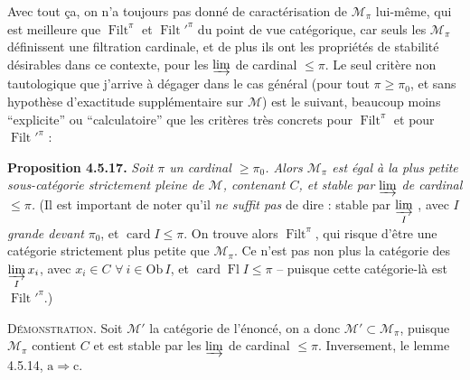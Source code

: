 \documentclass[11pt]{article}
\newcommand{\msp}[1]{\marginpar{\footnotesize [#1]}}
\newcommand{\Ob}{\mathrm{Ob}\,}
\newcommand{\card}{\operatorname{card}}
\newcommand{\Fl}{\operatorname{Fl}}
\newcommand{\Filt}{\operatorname{Filt}}
\begin{document}
Avec tout ça, on n'a toujours pas donné de caractérisation de $\mathcal{M}_{\pi}$ lui-même, qui est meilleure que $\Filt^{\pi}$ et $\Filt'^{\pi}$ du point de vue catégorique, car seuls les $\mathcal{M}_{\pi}$ définissent une filtration cardinale, et de plus ils ont les propriétés de stabilité désirables dans ce
\msp{page 138}
contexte, pour les $\varinjlim$ de cardinal $\leqslant \pi$. Le seul critère non tautologique que j'arrive à dégager dans le cas général (pour tout $\pi \geqslant \pi_0$, et sans hypothèse d'exactitude supplémentaire sur $\mathcal{M}$) est le suivant, beaucoup moins ``explicite'' ou ``calculatoire'' que les critères très concrets pour $\Filt^{\pi}$ et pour $\Filt'^{\pi}$ :

\textbf{Proposition 4.5.17.} \textit{Soit $\pi$ un cardinal $\geqslant \pi_0$. Alors $\mathcal{M}_{\pi}$ est égal à la plus petite sous-catégorie strictement pleine de $\mathcal{M}$, contenant $C$, et stable par} $\varinjlim$ \textit{de cardinal $\leqslant \pi$.} (Il est important de noter qu'il \textit{ne suffit pas} de dire : stable par $\varinjlim\limits_{I}$ , avec \textit{$I$ grande devant} $\pi_0$, et $\card I \leqslant \pi$. On trouve alors $\Filt^{\pi}$, qui risque d'être une catégorie strictement plus petite que $\mathcal{M}_{\pi}$. Ce n'est pas non plus la catégorie des $\varinjlim\limits_{I} x_i$, avec $x_i \in C$ $\forall\ i \in \Ob I$, et $\card \Fl I \leqslant \pi$ -- puisque cette catégorie-là est $\Filt'^{\pi}$.)

\textsc{Démonstration}. Soit $\mathcal{M}'$ la catégorie de l'énoncé, on a donc $\mathcal{M}' \subset \mathcal{M}_{\pi}$, puisque $\mathcal{M}_{\pi}$ contient $C$ et est stable par les $\varinjlim$ de cardinal $\leqslant \pi$. Inversement, le lemme 4.5.14, $\mathrm{a} \Longrightarrow \mathrm{c}$.
\end{document}
